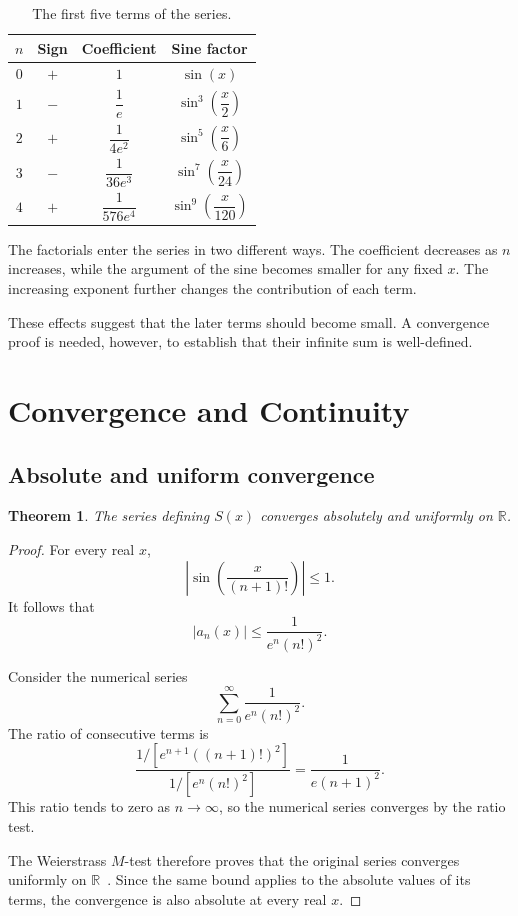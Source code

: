 \documentclass[12pt]{article}
\newtheorem{theorem}{Theorem}[section]
\theoremstyle{definition}
\theoremstyle{remark}
\begin{document}
\begin{table}[htbp]
\centering
\caption{The first five terms of the series.}
\label{tab:first-terms}
\renewcommand{\arraystretch}{1.5}
\setlength{\tabcolsep}{7pt}

\begin{tabular}{c c c c}
\toprule
\(n\) & Sign & Coefficient & Sine factor \\
\midrule
\(0\) & \(+\) & \(1\) &
\(\sin(x)\) \\

\(1\) & \(-\) & \(\dfrac{1}{e}\) &
\(\sin^3\left(\dfrac{x}{2}\right)\) \\

\(2\) & \(+\) & \(\dfrac{1}{4e^2}\) &
\(\sin^5\left(\dfrac{x}{6}\right)\) \\

\(3\) & \(-\) & \(\dfrac{1}{36e^3}\) &
\(\sin^7\left(\dfrac{x}{24}\right)\) \\

\(4\) & \(+\) & \(\dfrac{1}{576e^4}\) &
\(\sin^9\left(\dfrac{x}{120}\right)\) \\
\bottomrule
\end{tabular}
\end{table}

The factorials enter the series in two different ways. The
coefficient decreases as \(n\) increases, while the argument
of the sine becomes smaller for any fixed \(x\). The increasing
exponent further changes the contribution of each term.

These effects suggest that the later terms should become
small. A convergence proof is needed, however, to establish
that their infinite sum is well-defined.

\section{Convergence and Continuity}

\subsection{Absolute and uniform convergence}

\begin{theorem}
The series defining \(S(x)\) converges absolutely and uniformly
on \(\mathbb{R}\).
\end{theorem}

\begin{proof}
For every real \(x\),
\[
\left|\sin\left(\frac{x}{(n+1)!}\right)\right|\leq 1.
\]
It follows that
\[
|a_n(x)|\leq \frac{1}{e^n(n!)^2}.
\]

Consider the numerical series
\[
\sum_{n=0}^{\infty}\frac{1}{e^n(n!)^2}.
\]
The ratio of consecutive terms is
\[
\frac{1/[e^{n+1}((n+1)!)^2]}
     {1/[e^n(n!)^2]}
=\frac{1}{e(n+1)^2}.
\]
This ratio tends to zero as \(n\to\infty\), so the numerical
series converges by the ratio test.

The Weierstrass \(M\)-test therefore proves that the original
series converges uniformly on \(\mathbb{R}\)~\cite{rudin}. Since the same
bound applies to the absolute values of its terms, the
convergence is also absolute at every real \(x\).
\end{proof}
\end{document}
